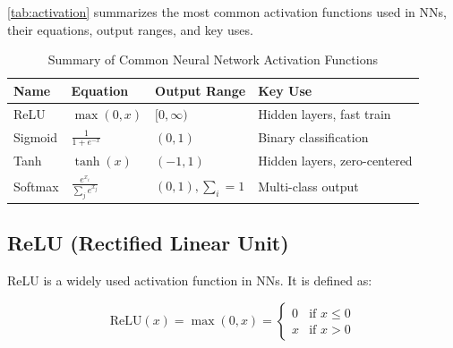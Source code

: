 \documentclass[oneside,11pt,dvipsnames]{book}
\numberwithin{equation}{section}
\theoremstyle{definition}
\theoremstyle{remark}
\newcommand{\relu}[1]{\mathrm{ReLU}\left(#1\right)}
\newcommand{\sigmoid}[1]{\mathrm{sigmoid}\left(#1\right)}
\begin{document}
\autoref{tab:activation} summarizes the most common activation functions used in NNs, their equations, output ranges, and key uses.

\begin{table}
  \centering
  \caption{Summary of Common Neural Network Activation Functions}\label{tab:activation}
  \small
  \begin{tabular}{llll}
    \toprule
    \textbf{Name} & \textbf{Equation} & \textbf{Output Range} & \textbf{Key Use} \\
    \midrule
    ReLU      & $ \max(0, x) $                   & $[0, \infty)$   & Hidden layers, fast train \\    
    Sigmoid   & $ \frac{1}{1 + e^{-x}} $         & $(0, 1)$        & Binary classification \\
    Tanh      & $ \tanh(x) $                     & $(-1, 1)$       & Hidden layers, zero-centered \\
    Softmax   & $ \frac{e^{x_i}}{\sum_j e^{x_j}} $& $(0, 1), \sum_i=1 $ & Multi-class output \\    
    \bottomrule
  \end{tabular}
\end{table}


\subsection{ReLU (Rectified Linear Unit)}\label{sec:relu}

ReLU is a widely used activation function in NNs. It is defined as:

\[
\relu{x} = \max(0, x) = 
\begin{cases}
0 & \text{if } x \leq 0 \\
x & \text{if } x > 0
\end{cases}
\]
\end{document}
